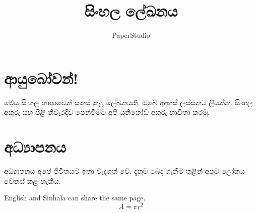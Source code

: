 \documentclass[12pt,a4paper]{article}
\title{සිංහල ලේඛනය}
\author{{\englishfont PaperStudio}}
\date{}
\begin{document}
\maketitle
\section{ආයුබෝවන්!}
මෙය සිංහල භාෂාවෙන් සකස් කළ ලේඛනයකි.
ඔබේ අදහස් ලස්සනට ලියන්න. සිංහල අකුරු සහ පිළි නිවැරදිව පෙන්වීමට
අපි යුනිකෝඩ් අකුරු භාවිතා කරමු.

\section{අධ්‍යාපනය}
අධ්‍යාපනය අපේ ජීවිතයට ඉතා වැදගත් වේ.
දැනුම බෙදා ගැනීම තුළින් අපට ලෝකය වෙනස් කළ හැකිය.

{\englishfont English and Sinhala can share the same page.}
\[
  A = \pi r^2
\]
\end{document}
